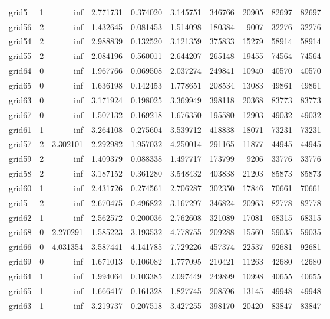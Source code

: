\begin{longtable}{|l|r|r|r|r|r|r|r|r|r|}
grid5 & 1 & inf & 2.771731 & 0.374020 & 3.145751 & 346766 & 20905 & 82697 & 82697 \\
grid56 & 2 & inf & 1.432645 & 0.081453 & 1.514098 & 180384 & 9007 & 32276 & 32276 \\
grid54 & 2 & inf & 2.988839 & 0.132520 & 3.121359 & 375833 & 15279 & 58914 & 58914 \\
grid55 & 2 & inf & 2.084196 & 0.560011 & 2.644207 & 265148 & 19455 & 74564 & 74564 \\
grid64 & 0 & inf & 1.967766 & 0.069508 & 2.037274 & 249841 & 10940 & 40570 & 40570 \\
grid65 & 0 & inf & 1.636198 & 0.142453 & 1.778651 & 208534 & 13083 & 49861 & 49861 \\
grid63 & 0 & inf & 3.171924 & 0.198025 & 3.369949 & 398118 & 20368 & 83773 & 83773 \\
grid67 & 0 & inf & 1.507132 & 0.169218 & 1.676350 & 195580 & 12903 & 49032 & 49032 \\
grid61 & 1 & inf & 3.264108 & 0.275604 & 3.539712 & 418838 & 18071 & 73231 & 73231 \\
grid57 & 2 & 3.302101 & 2.292982 & 1.957032 & 4.250014 & 291165 & 11877 & 44945 & 44945 \\
grid59 & 2 & inf & 1.409379 & 0.088338 & 1.497717 & 173799 & 9206 & 33776 & 33776 \\
grid58 & 2 & inf & 3.187152 & 0.361280 & 3.548432 & 403838 & 21203 & 85873 & 85873 \\
grid60 & 1 & inf & 2.431726 & 0.274561 & 2.706287 & 302350 & 17846 & 70661 & 70661 \\
grid5 & 2 & inf & 2.670475 & 0.496822 & 3.167297 & 346824 & 20963 & 82778 & 82778 \\
grid62 & 1 & inf & 2.562572 & 0.200036 & 2.762608 & 321089 & 17081 & 68315 & 68315 \\
grid68 & 0 & 2.270291 & 1.585223 & 3.193532 & 4.778755 & 209288 & 15560 & 59035 & 59035 \\
grid66 & 0 & 4.031354 & 3.587441 & 4.141785 & 7.729226 & 457374 & 22537 & 92681 & 92681 \\
grid69 & 0 & inf & 1.671013 & 0.106082 & 1.777095 & 210421 & 11263 & 42680 & 42680 \\
grid64 & 1 & inf & 1.994064 & 0.103385 & 2.097449 & 249899 & 10998 & 40655 & 40655 \\
grid65 & 1 & inf & 1.666417 & 0.161328 & 1.827745 & 208596 & 13145 & 49948 & 49948 \\
grid63 & 1 & inf & 3.219737 & 0.207518 & 3.427255 & 398170 & 20420 & 83847 & 83847 \\

\end{longtable}
